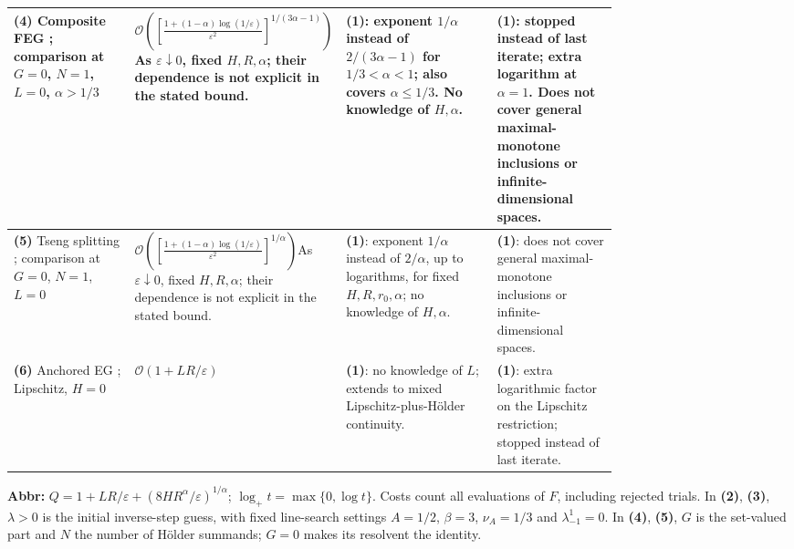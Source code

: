 \begin{table}[tp]
\begin{threeparttable}
\begin{tabularx}{\linewidth}{@{}>{\raggedright\arraybackslash}p{0.20\linewidth}>{\raggedright\arraybackslash}p{0.32\linewidth}>{\raggedright\arraybackslash}p{0.25\linewidth}>{\raggedright\arraybackslash}X@{}}
\midrule
\textbf{(4)} Composite FEG \citep[Thm.~2]{holderZhang2026v1}; comparison at $G=0$, $N=1$, $L=0$, $\alpha>1/3$ & $\mathcal{O}\!\left(\left[\frac{1+(1-\alpha)\log(1/\varepsilon)}{\varepsilon^2}\right]^{\!1/(3\alpha-1)}\right)$\newline As $\varepsilon\downarrow0$, fixed $H,R,\alpha$; their dependence is not explicit in the stated bound. & \textbf{(1)}: exponent $1/\alpha$ instead of $2/(3\alpha-1)$ for $1/3<\alpha<1$; also covers $\alpha\le1/3$. No knowledge of $H,\alpha$. & \textbf{(1)}: stopped instead of last iterate; extra logarithm at $\alpha=1$. Does not cover general maximal-monotone inclusions or infinite-dimensional spaces. \\
\midrule
\textbf{(5)} Tseng splitting \citep[Thm.~1]{holderZhang2026v1}; comparison at $G=0$, $N=1$, $L=0$ & $\mathcal{O}\!\left(\left[\frac{1+(1-\alpha)\log(1/\varepsilon)}{\varepsilon^2}\right]^{\!1/\alpha}\right)$\newline As $\varepsilon\downarrow0$, fixed $H,R,\alpha$; their dependence is not explicit in the stated bound. & \textbf{(1)}: exponent $1/\alpha$ instead of $2/\alpha$, up to logarithms, for fixed $H,R,r_0,\alpha$; no knowledge of $H,\alpha$. & \textbf{(1)}: does not cover general maximal-monotone inclusions or infinite-dimensional spaces. \\
\midrule
\textbf{(6)} Anchored EG \citep[Cor.~2, Sec.~2.3]{yoon2021adjoint}; Lipschitz, $H=0$ & $\mathcal{O}(1+LR/\varepsilon)$ & \textbf{(1)}: no knowledge of $L$; extends to mixed Lipschitz-plus-H\"older continuity. & \textbf{(1)}: extra logarithmic factor on the Lipschitz restriction; stopped instead of last iterate. \\
\bottomrule
\end{tabularx}
\begin{tablenotes}[flushleft]\footnotesize
\item[] \textbf{Abbr:} $Q=1+LR/\varepsilon+(8HR^\alpha/\varepsilon)^{1/\alpha}$; $\log_+t=\max\{0,\log t\}$. Costs count all evaluations of $F$, including rejected trials. In \textbf{(2)}, \textbf{(3)}, $\lambda>0$ is the initial inverse-step guess, with fixed line-search settings $A=1/2$, $\beta=3$, $\nu_A=1/3$ and $\lambda_{-1}^1=0$. In \textbf{(4)}, \textbf{(5)}, $G$ is the set-valued part and $N$ the number of H\"older summands; $G=0$ makes its resolvent the identity.
\end{tablenotes}
\end{threeparttable}
\end{table}
\clearpage
